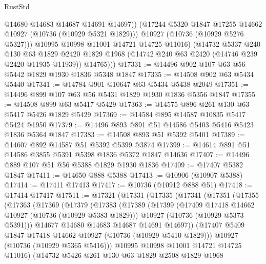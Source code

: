\begin{lexlean}{RustStd}
\begin{coremodule}
                @14680
                @14683
                @14687
                @14691
                @14697))
            (@17244 @5320 @1847 @17255 @14662 @10927 (@10736 (@10929 @5321 @1829)))
            @10927
            (@10736 (@10929 @5276 @5327)))
          @10995
          @10998
          @11001
          @14721
          @14725
          @11016)
        (@14732
          @5337
          @240
          @130
          @63
          @1829
          @2420
          @1829
          @1968
          (@14742 @240 @63 @2420 (@14746 @239 @2420 @11935 @11939))
          @14765)))
@17331 := @14496 @902 @107 @63 @56 @5442 @1829 @1930 @1836 @5348 @1847
@17335 := @14508 @902 @63 @5434 @5440
@17341 := @14784 @901 @10647 @63 @5434 @5438 @2049
@17351 := @14496 @899 @107 @63 @56 @5431 @1829 @1930 @1836 @5356 @1847
@17355 := @14508 @899 @63 @5417 @5429
@17363 := @14575 @896 @261 @130 @63 @5417 @5426 @1829 @5429
@17369 := @14584 @895 @14587 @10835 @5417 @5424 @1950
@17379 := @14496 @893 @891 @51 @14586 @5403 @5416 @5423 @1836 @5364 @1847
@17383 := @14508 @893 @51 @5392 @5401
@17389 := @14607 @892 @14587 @51 @5392 @5399 @3874
@17399 := @14614 @891 @51 @14586 @3855 @5391 @5398 @1836 @5372 @1847 @14636
@17407 := @14496 @889 @107 @51 @56 @5388 @1829 @1930 @1836
@17409 := @17407 @5382 @1847
@17411 := @14650 @888 @5388
@17413 := @10906 (@10907 @5388)
@17414 := @17411 @17413
@17417 := @10736 (@10912 @888 @51)
@17418 := @17414 @17417
@17511 := @17321
    (@17331
      (@17335
        (@17341
          (@17351
            (@17355
              (@17363
                (@17369
                  (@17379
                    (@17383
                      (@17389
                        (@17399
                          (@17409 @17418 @14662 @10927 (@10736 (@10929 @5383 @1829)))
                          @10927
                          (@10736 (@10929 @5373 @5391)))
                        @14677
                        @14680
                        @14683
                        @14687
                        @14691
                        @14697))
                    (@17407 @5409 @1847 @17418 @14662 @10927 (@10736 (@10929 @5410 @1829)))
                    @10927
                    (@10736 (@10929 @5365 @5416)))
                  @10995
                  @10998
                  @11001
                  @14721
                  @14725
                  @11016)
                (@14732
                  @5426
                  @261
                  @130
                  @63
                  @1829
                  @2508
                  @1829
                  @1968

\end{coremodule}
\end{lexlean}
